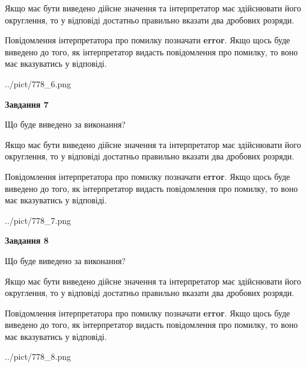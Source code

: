 \documentclass[12pt, ukrainian]{article}
\begin{document}
{\begin {Large}
Якщо має бути виведено дійсне значення та інтерпретатор має здійснювати його округлення, 
то у відповіді достатньо правильно вказати два дробових розряди.

Повідомлення інтерпретатора про помилку позначати \textbf{error}.
Якщо щось буде виведено до того, як інтерпретатор видасть повідомлення про помилку, 
то воно має вказуватись у відповіді. \par

\begin{center}
	{../pict/778_6.png}
\end{center}
\newpage

{\begin {center}\textbf{Завдання 7}\end {center}}\par
Що буде виведено за виконання? \par

Якщо має бути виведено дійсне значення та інтерпретатор має здійснювати його округлення, 
то у відповіді достатньо правильно вказати два дробових розряди.

Повідомлення інтерпретатора про помилку позначати \textbf{error}.
Якщо щось буде виведено до того, як інтерпретатор видасть повідомлення про помилку, 
то воно має вказуватись у відповіді. \par

\begin{center}
	{../pict/778_7.png}
\end{center}
\newpage

{\begin {center}\textbf{Завдання 8}\end {center}}\par
Що буде виведено за виконання? \par

Якщо має бути виведено дійсне значення та інтерпретатор має здійснювати його округлення, 
то у відповіді достатньо правильно вказати два дробових розряди.

Повідомлення інтерпретатора про помилку позначати \textbf{error}.
Якщо щось буде виведено до того, як інтерпретатор видасть повідомлення про помилку, 
то воно має вказуватись у відповіді. \par

\begin{center}
	{../pict/778_8.png}
\end{center}
\newpage


\end{Large}}
\end{document}

